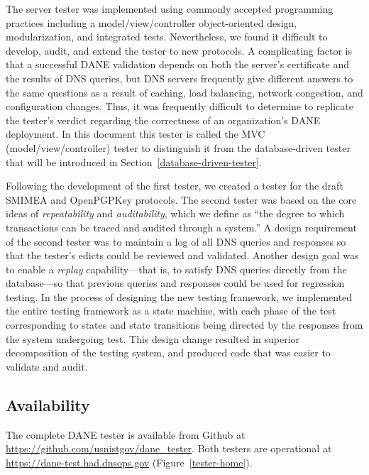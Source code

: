 \documentclass[preprint,3p,11pt]{elsarticle}
\begin{document}
The server tester was implemented using commonly accepted
programming practices including a model/view/controller object-oriented design,
modularization, and integrated tests. Nevertheless, we found
it difficult to develop, audit, and extend the tester to new protocols. A 
complicating factor is that a successful DANE validation depends on both the server's certificate and the results of DNS
queries, but DNS servers frequently give different answers to the same
questions as a result of caching, load balancing, network congestion,
and configuration changes. Thus, it was frequently difficult to
determine to replicate the tester's verdict regarding the correctness
of an organization's DANE deployment. In this document this tester is called the MVC
(model/view/controller) tester to distinguish it from the
database-driven tester that will be introduced in Section~\ref{database-driven-tester}.

Following the development of the first tester, we created a
tester for the draft SMIMEA and OpenPGPKey protocols. The second
tester was based on the core ideas of \emph{repeatability} and \emph{auditability},
which we define as ``the degree to which transactions can be traced
and audited through a system.'' A design requirement of the second tester  was to maintain a log of all DNS queries and responses
so that the tester's edicts could be reviewed and validated. Another
design goal was to enable a \emph{replay} capability---that is, to
satisfy DNS queries directly from the database---so that previous
queries and responses could be used for regression testing. In the
process of designing the new testing framework, we implemented the entire
testing framework as a state machine, with each phase
of the test corresponding to states and state transitions being
directed by the responses from the system undergoing test. This design
change resulted in superior decomposition of the testing system,
and produced code that was easier to validate and audit.

\subsection{Availability}

The complete DANE tester is available from Github at
\url{https://github.com/usnistgov/dane_tester}. Both testers are
operational at \url{https://dane-test.had.dnsops.gov} (Figure~\ref{tester-home}).

\newcommand\sgraphic[2]{
\begin{figure}
\begin{center}
\texttt{[image: \#1]}
\end{center}
\caption{#2}\label{#1}
\end{figure}
}
\end{document}
